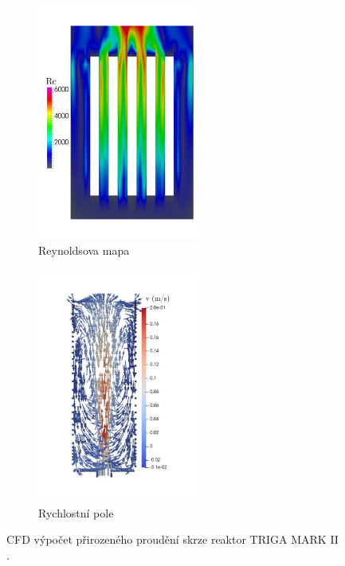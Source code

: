 \begin{figure}[H]
	\centering
	\begin{subfigure}{0.5\textwidth}
		\centering
		\vspace{0cm}
		\includegraphics[width=0.6\textwidth, trim={1cm 2cm 1cm 2cm}, clip]{./05_TH_model_VR_1/obrazky/cfd_triga_reynolds_number.pdf}
		\vspace{0pt}
			\caption{Reynoldsova mapa}
			\label{fig:cfd_triga_reynolds}
	\end{subfigure}%
	\hfill
	\begin{subfigure}{0.5\textwidth}
		\centering
		\includegraphics[width=0.6\textwidth, trim={2cm, 3cm, 2cm, 3cm}, clip]{./05_TH_model_VR_1/obrazky/triga_cfd_velocities.pdf}
		\caption{Rychlostní pole}
		\label{fig:cfd_triga_velocities}
	\end{subfigure}
	\caption{CFD výpočet přirozeného proudění skrze reaktor TRIGA MARK II \cite{TRIGA_CFD}.}
\end{figure}


